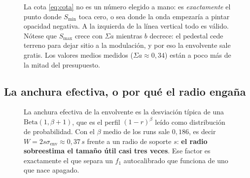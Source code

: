 \documentclass[12pt]{extarticle}
\newcommand{\figcap}[1]{\caption{\small #1}}
\newcommand{\ssum}{\Sigma a}
\begin{document}
\begin{figure}[H]\centering
{}
\figcap{La cota \eqref{eq:cota} no es un número elegido a mano: es
\emph{exactamente} el punto donde $S_{\min}$ toca cero, o sea donde la onda
empezaría a pintar opacidad negativa. A la izquierda de la línea vertical todo
es válido. Nótese que $S_{\max}$ crece con $\ssum$ mientras $b$ decrece: el
pedestal cede terreno para dejar sitio a la modulación, y por eso la envolvente
sale gratis. Los valores medios medidos ($\ssum\approx0{,}34$) están a poco más
de la mitad del presupuesto.}
\end{figure}

\subsection{La anchura efectiva, o por qué el radio engaña}

\begin{figure}[H]\centering
{}
\figcap{La anchura efectiva de la envolvente es la desviación típica de una
$\mathrm{Beta}(1,\beta+1)$, que es el perfil $(1-r)^\beta$ leído como
distribución de probabilidad. Con el $\beta$ medio de los runs sale $0{,}186$,
es decir $W=2s\sigma_{\text{env}}\approx 0{,}37\,s$ frente a un radio de
soporte $s$: \textbf{el radio sobreestima el tamaño útil casi tres veces}. Ese
factor es exactamente el que separa un $f_1$ autocalibrado que funciona de uno
que nace apagado.}
\end{figure}
\end{document}
